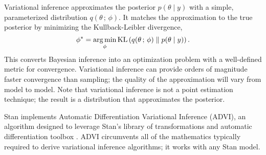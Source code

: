 Variational inference approximates the posterior
$p(\theta \mid y)$ with a simple, parameterized distribution
$q(\theta \,;\, \phi)$. It matches the approximation to the
true posterior by minimizing the Kullback-Leibler divergence,
%
\[
  \phi^* = \argmin_\phi
  \KL{ q(\theta \,;\, \phi) }{ p(\theta \mid y) }.
\]
%
This converts Bayesian inference into an optimization problem with a
well-defined metric for convergence. Variational inference can provide orders of
magnitude faster convergence than sampling; the quality of the approximation
will vary from model to model. Note that variational inference is not a point
estimation technique; the result is a distribution that approximates the
posterior.

Stan implements Automatic Differentiation Variational Inference (ADVI), an
algorithm designed to leverage Stan's library of transformations and automatic
differentiation toolbox \citep{Kucukelbir:2015}. ADVI circumvents all of the
mathematics typically required to derive variational inference algorithms; it
works with any Stan model.



